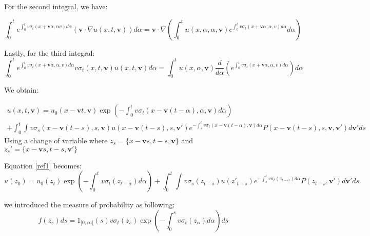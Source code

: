 \documentclass[a4paper,12pt]{article}
\begin{document}
	For the second integral, we have:
	
	\begin{equation*}
		\int_0^t e^{\int _0^t v\sigma_t (x + \textbf{v}\alpha,\alpha v) d\alpha} (\textbf{v} \cdot \nabla u(x,t,\textbf{v})) d\alpha = \textbf{v} \cdot \nabla \left(\int_0^t u(x, \alpha,\alpha, \textbf{v}) e^{\int _0^t v\sigma_t (x + \textbf{v}\alpha,\alpha, v) d\alpha} d\alpha\right)  
	\end{equation*}
	
	
	Lastly, for the third integral:
	\begin{equation*}
		\int_0^t e^{\int _0^t v\sigma_t (x + \textbf{v}\alpha,\alpha, v) d\alpha} v\sigma_t (x,t,\textbf{v})u(x,t,\textbf{v}) d\alpha = \int_0^t u(x, \alpha, \textbf{v}) \frac{d}{d\alpha} \left(e^{\int _0^t v\sigma_t (x + \textbf{v}\alpha,\alpha, v) d\alpha}\right) d\alpha 
	\end{equation*}
	
	
	
	
	
	
	
	We obtain:
	
	
	
	\begin{multline}
		u(x,t,\textbf{v}) = u_0(x - \textbf{v}t, \textbf{v}) \exp\left(- \int_{0}^{t} v\sigma_t\left(x - \textbf{v}(t - \alpha), \alpha, \textbf{v}\right) d\alpha\right) \\
		+ \int_{0}^{t} \int v\sigma_s\left(x - \textbf{v}(t - s), s, \textbf{v}\right) u\left(x - \textbf{v}(t - s), s, \textbf{v}'\right) e^{- \int_s^t v\sigma_t\left(x - \textbf{v}(t - \alpha), \textbf{v}\right) d\alpha} P\left(x - \textbf{v}(t - s), s, \textbf{v}, \textbf{v}'\right) d\textbf{v}'ds \label{ref1}
	\end{multline}
	Using a change of variable where $z_s = \{x- \textbf{v}s,t- s,\textbf{v}\}$ and $z_s' = \{x- \textbf{v}s,t- s,\textbf{v}'\}$
	
	Equation \ref{ref1} becomes:
	\begin{equation}
		u(z_0) = u_0(z_t) \exp\left(- \int_{0}^{t} v\sigma_t (z_{t-\alpha}) d\alpha\right) + 
		\int_{0}^{t} \int v\sigma_s (z_{t-s}) u(z'_{t-s}) e^{-\int_s^t v\sigma_t (z_{t-\alpha})  d\alpha} P(z_{t-s},\textbf{v}')d\textbf{v}' ds \label{ref2}
	\end{equation}
	
	we introduced the measure of probability as following:
	\begin{equation*}
		f (z_s)ds = 1_{[0,\infty[}(s)v\sigma_t (z_s )\exp\left(-\int_{0}^{s} v\sigma_t (z_\alpha)d\alpha\right)ds
	\end{equation*}
	
\end{document}
